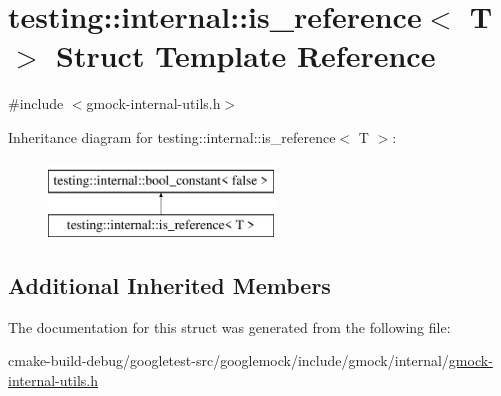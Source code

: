 \hypertarget{structtesting_1_1internal_1_1is__reference}{}\section{testing\+::internal\+::is\+\_\+reference$<$ T $>$ Struct Template Reference}
\label{structtesting_1_1internal_1_1is__reference}


{\ttfamily \#include $<$gmock-\/internal-\/utils.\+h$>$}

Inheritance diagram for testing\+::internal\+::is\+\_\+reference$<$ T $>$\+:\begin{figure}[H]
\begin{center}
\leavevmode
\includegraphics[height=2.000000cm]{structtesting_1_1internal_1_1is__reference}
\end{center}
\end{figure}
\subsection*{Additional Inherited Members}


The documentation for this struct was generated from the following file\+:\begin{DoxyCompactItemize}
\item 
cmake-\/build-\/debug/googletest-\/src/googlemock/include/gmock/internal/\mbox{\hyperlink{gmock-internal-utils_8h}{gmock-\/internal-\/utils.\+h}}\end{DoxyCompactItemize}
